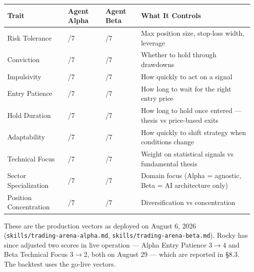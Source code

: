 \documentclass[11pt]{article}
\begin{document}
{\def\LTcaptype{none} %
{\small
\begin{longtable}{@{}
  >{\raggedright\arraybackslash}p{}
  >{\raggedright\arraybackslash}p{}
  >{\raggedright\arraybackslash}p{}
  >{\raggedright\arraybackslash}p{}@{}}
\toprule\noalign{}
\begin{minipage}[b]{\linewidth}\raggedright
Trait
\end{minipage} & \begin{minipage}[b]{\linewidth}\raggedright
Agent Alpha
\end{minipage} & \begin{minipage}[b]{\linewidth}\raggedright
Agent Beta
\end{minipage} & \begin{minipage}[b]{\linewidth}\raggedright
What It Controls
\end{minipage} \\
\midrule\noalign{}
\endhead
\bottomrule\noalign{}
\endlastfoot
\renewcommand{\arraystretch}{1.15}
Risk Tolerance & 3/7 & 5/7 & Max position size, stop-loss width, leverage \\
Conviction & 2/7 & 6/7 & Whether to hold through drawdowns \\
Impulsivity & 2/7 & 3/7 & How quickly to act on a signal \\
Entry Patience & 3/7 & 6/7 & How long to wait for the right entry price \\
Hold Duration & 3/7 & 7/7 & How long to hold once entered --- thesis vs price-based exits \\
Adaptability & 4/7 & 6/7 & How quickly to shift strategy when conditions change \\
Technical Focus & 7/7 & 3/7 & Weight on statistical signals vs fundamental thesis \\
Sector Specialization & 1/7 & 7/7 & Domain focus (Alpha = agnostic, Beta = AI architecture only) \\
Position Concentration & 4/7 & 4/7 & Diversification vs concentration \\
\end{longtable}}
}

These are the production vectors as deployed on August 6, 2026 (\texttt{skills/trading-arena-alpha.md}, \texttt{skills/trading-arena-beta.md}). Rocky has since adjusted two scores in live operation --- Alpha Entry Patience 3$\rightarrow$4 and Beta Technical Focus 3$\rightarrow$2, both on August 29 --- which are reported in §8.3. The backtest uses the go-live vectors.
\end{document}
